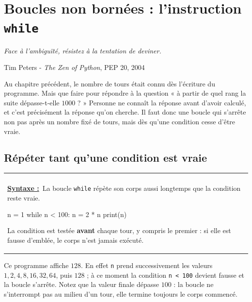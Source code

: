 \documentclass[a4paper,11pt,openany]{book}
\makeatletter
\newcommand{\code}[1]{\texttt{\textcolor{codebleu}{#1}}}
\newenvironment{cadre}%
 {\par\vspace{2mm}\noindent\begin{tabular}{|@{\hspace{4mm}}p{0.93\textwidth}@{\hspace{4mm}}|}
  \hline \\[-2mm]}%
 {\\[2mm] \hline \end{tabular}\par\vspace{3mm}}
\newcommand{\syntaxe}{\textbf{\underline{Syntaxe :}}~}
\newcommand{\epigraphe}[2]{%
  \begin{list}{}{\leftmargin=1cm \rightmargin=1cm}\item[]
  \small\textit{#1}
  \end{list}
  \nopagebreak
  \hfill\small #2 \par\vspace{4mm}}
\makeatother
\begin{document}
\chapter[Boucles non bornées : \texttt{while}]{Boucles non bornées : l'instruction \texttt{while}}

\epigraphe{Face à l'ambiguïté, résistez à la tentation de deviner.}{Tim Peters - \emph{The Zen of Python}, PEP 20, 2004}

Au chapitre précédent, le nombre de tours était connu dès l'écriture du programme. Mais que faire pour répondre à la question « à partir de quel rang la suite dépasse-t-elle $1000$ ? » Personne ne connaît la réponse avant d'avoir calculé, et c'est précisément la réponse qu'on cherche. Il faut donc une boucle qui s'arrête non pas après un nombre fixé de tours, mais dès qu'une condition cesse d'être vraie.

\section{Répéter tant qu'une condition est vraie}

\begin{cadre}
\syntaxe La boucle \code{while} répète son corps aussi longtemps que la condition reste vraie.
\begin{python}
n = 1
while n < 100:
    n = 2 * n
print(n)
\end{python}
La condition est testée \textbf{avant} chaque tour, y compris le premier : si elle est fausse d'emblée, le corps n'est jamais exécuté.
\end{cadre}

Ce programme affiche $128$. En effet \code{n} prend successivement les valeurs $1, 2, 4, 8, 16, 32, 64$, puis $128$ ; à ce moment la condition \code{n < 100} devient fausse et la boucle s'arrête. Notez que la valeur finale dépasse $100$ : la boucle ne s'interrompt pas au milieu d'un tour, elle termine toujours le corps commencé.
\end{document}
